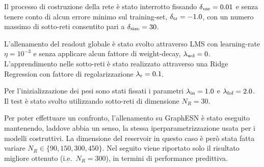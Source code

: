 Il processo di costruzione della rete è stato interrotto fissando $\delta_\textup{var} = 0.01$ e senza tenere conto di alcun errore minimo sul training-set, $\delta_\textup{tr} = -1.0$, con un numero massimo di sotto-reti consentito pari a $\delta_\textup{size} = 30$.

L'allenamento del readout globale è stato svolto attraverso LMS con learning-rate $\eta = 10^{-3}$ e senza applicare alcun fattore di weight-decay, $\lambda_\textup{wd} = 0$.
L'apprendimento nelle sotto-reti è stato realizzato attraverso una Ridge Regression con fattore di regolarizzazione $\lambda_\textup{r} = 0.1$.

Per l'inizializzazione dei pesi sono stati fissati i parametri $\lambda_\textup{in} = 1.0$ e $\lambda_\textup{fof} = 2.0$. 
Il test è stato svolto utilizzando sotto-reti di dimensione $N_R = 30$.

Per poter effettuare un confronto, l'allenamento su GraphESN è stato eseguito mantenendo, laddove abbia un senso, la stessa iperparametrizzazione usata per i modelli costruttivi. La dimensione del reservoir in questo caso è però stata fatta variare $N_R \in \lbrace 90, 150, 300, 450 \rbrace$. Nel seguito viene riportato solo il risultato migliore ottenuto (i.e.\ $N_R = 300$), in termini di performance predittiva.

